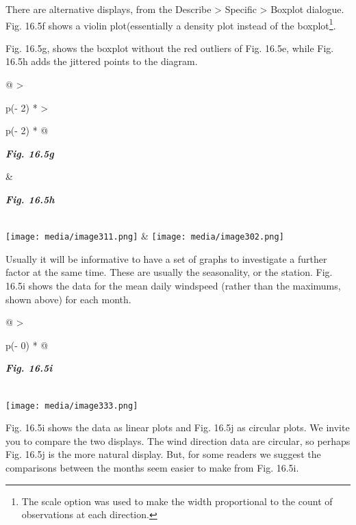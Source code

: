 \documentclass[
  letterpaper,
  DIV=11,
  numbers=noendperiod]{scrreprt}
\begin{document}
There are alternative displays, from the Describe \textgreater{}
Specific \textgreater{} Boxplot dialogue. Fig. 16.5f shows a violin
plot(essentially a density plot instead of the boxplot\footnote{The
  scale option was used to make the width proportional to the count of
  observations at each direction.}.

Fig. 16.5g, shows the boxplot without the red outliers of Fig. 16.5e,
while Fig. 16.5h adds the jittered points to the diagram.

\begin{longtable}[]{@{}
  >{\raggedright\arraybackslash}p{(\columnwidth - 2\tabcolsep) * }
  >{\raggedright\arraybackslash}p{(\columnwidth - 2\tabcolsep) * }@{}}
\toprule\noalign{}
\begin{minipage}[b]{\linewidth}\raggedright
\textbf{\emph{Fig. 16.5g}}
\end{minipage} & \begin{minipage}[b]{\linewidth}\raggedright
\textbf{\emph{Fig. 16.5h}}
\end{minipage} \\
\midrule\noalign{}
\endhead
\bottomrule\noalign{}
\endlastfoot
\texttt{[image: media/image311.png]} &
\texttt{[image: media/image302.png]} \\
\end{longtable}

Usually it will be informative to have a set of graphs to investigate a
further factor at the same time. These are usually the seasonality, or
the station. Fig. 16.5i shows the data for the mean daily windspeed
(rather than the maximums, shown above) for each month.

\begin{longtable}[]{@{}
  >{\raggedright\arraybackslash}p{(\columnwidth - 0\tabcolsep) * }@{}}
\toprule\noalign{}
\begin{minipage}[b]{\linewidth}\raggedright
\textbf{\emph{Fig. 16.5i}}
\end{minipage} \\
\midrule\noalign{}
\endhead
\bottomrule\noalign{}
\endlastfoot
\texttt{[image: media/image333.png]} \\
\end{longtable}

Fig. 16.5i shows the data as linear plots and Fig. 16.5j as circular
plots. We invite you to compare the two displays. The wind direction
data are circular, so perhaps Fig. 16.5j is the more natural display.
But, for some readers we suggest the comparisons between the months seem
easier to make from Fig. 16.5i.
\end{document}
